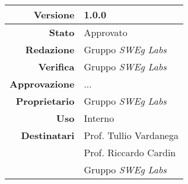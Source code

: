\thispagestyle{empty} %

\begin{center}
\begin{tabular}{r|l}
    \textbf{Versione} & 1.0.0 \\
    \hline
    \textbf{Stato} & Approvato \\
    \hline
    \textbf{Redazione} & Gruppo \emph{SWEg Labs} \\
    \hline
    \textbf{Verifica} & Gruppo \emph{SWEg Labs} \\
    \hline
    \textbf{Approvazione} & ... \\
    \hline
    \textbf{Proprietario} & Gruppo \emph{SWEg Labs} \\
    \hline
    \textbf{Uso} & Interno \\
    \hline
    \textbf{Destinatari} & Prof. Tullio Vardanega \\
                            & Prof. Riccardo Cardin \\
                            & Gruppo \emph{SWEg Labs} \\
\end{tabular}
\end{center}
    
